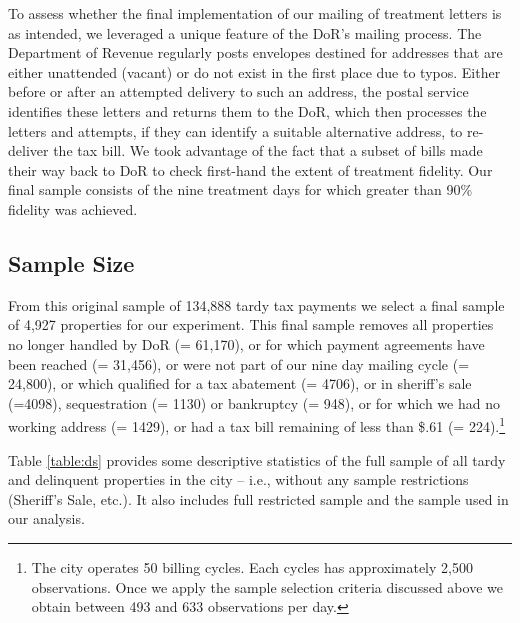 \documentclass[12pt,titlepage]{article}
\begin{document}
To assess whether the final implementation of our mailing of treatment
letters is as intended, we leveraged a unique feature of the DoR's
mailing process.  The Department of Revenue regularly posts envelopes
destined for addresses that are either unattended (vacant) or do not
exist in the first place due to typos. Either before or after an
attempted delivery to such an address, the postal service identifies
these letters and returns them to the DoR, which then processes the
letters and attempts, if they can identify a suitable alternative
address, to re-deliver the tax bill. We took advantage of the fact
that a subset of bills made their way back to DoR to check first-hand
the extent of treatment fidelity. Our final sample consists of the
nine treatment days for which greater than 90\% fidelity was achieved.

\subsection{Sample Size}

From this original sample of 134,888 tardy tax payments we select a
final sample of 4,927 properties for our experiment.  This final
sample removes all properties no longer handled by DoR (= 61,170), or
for which payment agreements have been reached (= 31,456), or were not
part of our nine day mailing cycle (= 24,800), or which qualified for
a tax abatement (= 4706), or in sheriff's sale (=4098), sequestration
(= 1130) or bankruptcy (= 948), or for which we had no working address
(= 1429), or had a tax bill remaining of less than \$.61 (=
224).\footnote{The city operates 50 billing cycles. Each cycles has
  approximately 2,500 observations.  Once we apply the sample
  selection criteria discussed above we obtain between 493 and 633
  observations per day.}


Table \ref{table:ds} provides some descriptive statistics of the full
sample of all tardy and delinquent properties in the city -- i.e.,
without any sample restrictions (Sheriff's Sale, etc.). It also
includes full restricted sample and the sample used in our analysis.
\end{document}
